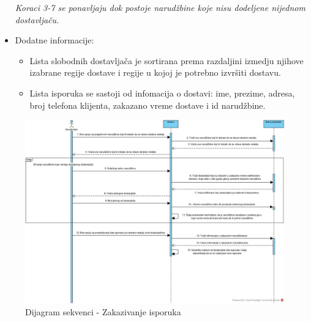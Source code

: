 \begin{itemize}
\begin{enumerate}
		\end{enumerate}
	  \textit{Koraci 3-7 se ponavljaju dok postoje narudžbine koje nisu dodeljene nijednom dostavljaču.}
   \item Dodatne informacije:
        \begin{itemize}
           \item Lista slobodnih dostavljača je sortirana prema razdaljini izmedju njihove izabrane regije dostave i regije u kojoj je potrebno izvršiti dostavu.
            \item Lista isporuka se sastoji od infomacija o dostavi: ime, prezime, adresa, broj telefona klijenta, zakazano vreme dostave i id narudžbine. 
        \end{itemize}
\end{itemize}

\begin{figure}[H]
\begin{center}
\includegraphics[width=\textwidth]{Pictures/sequence_scheduling_deliveries.jpg}
\end{center}
    \caption{Dijagram sekvenci - Zakazivanje isporuka}
\label{fig:Sequence_diagram_scheduling_deliveries}
\end{figure}


